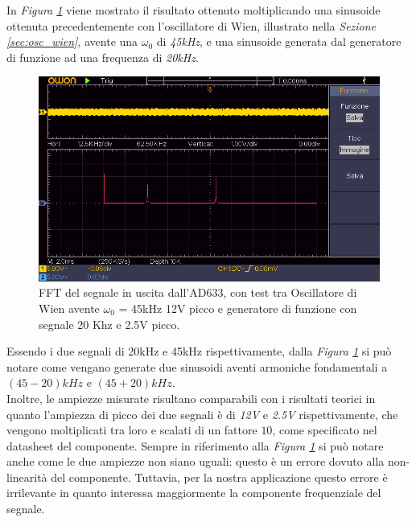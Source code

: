 \documentclass[titlepage]{report}
\begin{document}
	\noindent In \textit{Figura \ref{fig:FFTmixer}} viene mostrato il risultato ottenuto moltiplicando una sinusoide ottenuta precedentemente con l'oscillatore di Wien, illustrato nella \textit{Sezione \ref{sec:osc_wien}}, avente una $\omega_0$ di \textit{45kHz}, e una sinusoide generata dal generatore di funzione ad una frequenza di \textit{20kHz}.

	\begin{figure}[H]
		\centering
		\includegraphics[scale=0.9]{Immagini/uscita_ad633_con_fcngen_20k_e_osc_45k.png}
		\caption{FFT del segnale in uscita dall'AD633, con test tra Oscillatore di Wien avente $\omega_0$ = 45kHz 12V picco e generatore di funzione con segnale 20 Khz e 2.5V picco.}
		\label{fig:FFTmixer}
	\end{figure}
	
	 \noindent Essendo i due segnali di 20kHz e 45kHz rispettivamente, dalla \textit{Figura \ref{fig:FFTmixer}} si può notare come vengano generate due sinusoidi aventi armoniche fondamentali a $(45-20)kHz$ e $(45+20)kHz$. 
	 \\
	 Inoltre, le ampiezze misurate risultano comparabili con i risultati teorici in quanto l'ampiezza di picco dei due segnali è di \textit{12V} e \textit{2.5V} rispettivamente, che vengono moltiplicati tra loro e scalati di un fattore $10$, come specificato nel datasheet del componente. Sempre in riferimento alla \textit{Figura \ref{fig:FFTmixer}} si può notare anche come le due ampiezze non siano uguali: questo è un errore dovuto alla non-linearità del componente. Tuttavia, per la nostra applicazione questo errore è irrilevante in quanto interessa maggiormente la componente frequenziale del segnale.
	
\end{document}
